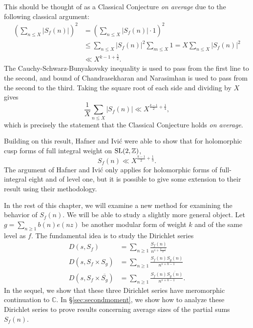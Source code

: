 This should be thought of as a Classical Conjecture \emph{on average} due to the following
classical argument:
\begin{align}
  \left( \sum_{n \leq X} \lvert S_f(n) \rvert \right)^2 &= \left( \sum_{n \leq X} \lvert
  S_f(n) \rvert \cdot 1 \right)^2
  \\
  &\leq \sum_{n \leq X} \lvert S_f(n) \rvert^2 \sum_{m \leq X} 1 = X \sum_{n \leq X}
  \lvert S_f(n) \rvert^2
  \\
  &\ll X^{k-1 + \frac{5}{2}}.
\end{align}
The Cauchy-Schwarz-Bunyakovsky inequality is used to pass from the first line to the
second, and bound of Chandrasekharan and Narasimhan is used to pass from the second to the
third.
Taking the square root of each side and dividing by $X$ gives
\begin{equation}
  \frac{1}{X} \sum_{n \leq X} \lvert S_f(n) \rvert \ll X^{\frac{k-1}{2} + \frac{1}{4}},
\end{equation}
which is precisely the statement that the Classical Conjecture holds \emph{on average}.



Building on this result, Hafner and Ivi\'c were able to show that for holomorphic cusp
forms of full integral weight on $\operatorname{SL}(2, \mathbb{Z})$,
\begin{equation}
  S_f(n) \ll X^{\frac{k-1}{2} + \frac{1}{3}}.
\end{equation}
The argument of Hafner and Ivi\'c only applies for holomorphic forms of full-integral
eight and of level one, but it is possible to give some extension to their result using
their methodology.


In the rest of this chapter, we will examine a new method for examining the behavior of $S_f(n)$.
We will be able to study a slightly more general object.
Let $g = \sum_{n \geq 1} b(n) e(nz)$ be another modular form of weight $k$ and of the same
level as $f$.
The fundamental idea is to study the Dirichlet series
\begin{align}
  D(s, S_f) &= \sum_{n \geq 1} \frac{S_f(n)}{n^{s + \frac{k-1}{2}}} \\
  D(s, S_f \times S_g) &= \sum_{n \geq 1} \frac{S_f(n) S_g(n)}{n^{s + k-1}} \\
  D(s, S_f \times \overline{S_g}) &= \sum_{n \geq 1}
  \frac{S_f(n) \overline{S_g(n)}}{n^{s + k-1}}.
\end{align}
In the sequel, we show that these three Dirichlet series have meromorphic continuation to
$\mathbb{C}$.
In \S\ref{sec:secondmoment}, we show how to analyze these Dirichlet series
to prove results concerning average sizes of the partial sums $S_f(n)$.


